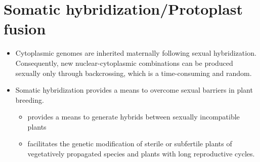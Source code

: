 \documentclass[
  ignorenonframetext,
  aspectratio=169]{beamer}
\providecommand{\tightlist}{%
  \setlength{\itemsep}{0pt}\setlength{\parskip}{0pt}}
\begin{document}
\hypertarget{somatic-hybridizationprotoplast-fusion}{%
\section{Somatic hybridization/Protoplast
fusion}\label{somatic-hybridizationprotoplast-fusion}}

\begin{frame}{}
\protect\hypertarget{section-10}{}
\begin{itemize}
\tightlist
\item
  Cytoplasmic genomes are inherited maternally following sexual
  hybridization. Consequently, new nuclear-cytoplasmic combinations can
  be produced sexually only through backcrossing, which is a
  time-consuming and random.
\item
  Somatic hybridization provides a means to overcome sexual barriers in
  plant breeding.

  \begin{itemize}
  \tightlist
  \item
    provides a means to generate hybrids between sexually incompatible
    plants
  \item
    facilitates the genetic modification of sterile or subfertile plants
    of vegetatively propagated species and plants with long reproductive
    cycles.
  \end{itemize}
\end{itemize}
\end{frame}
\end{document}
